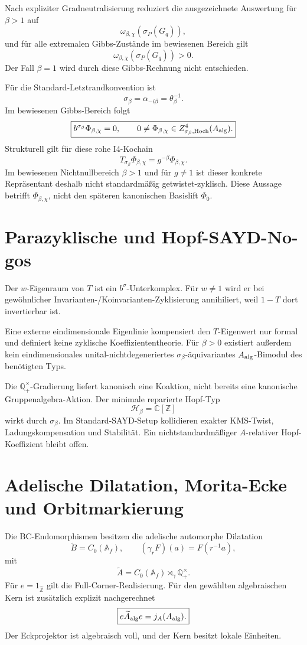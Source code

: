 \documentclass[11pt,a4paper]{article}
\begin{document}
Nach expliziter Gradneutralisierung reduziert die ausgezeichnete Auswertung für $\beta>1$ auf
\[
 \omega_{\beta,\chi}(\sigma_P(G_q)),
\]
und für alle extremalen Gibbs-Zustände im bewiesenen Bereich gilt
\[
 \boxed{\omega_{\beta,\chi}(\sigma_P(G_q))>0.}
\]
Der Fall $\beta=1$ wird durch diese Gibbs-Rechnung nicht entschieden.

Für die Standard-Letztrandkonvention ist
\[
 \boxed{\sigma_\beta=\alpha_{-i\beta}=\theta_\beta^{-1}.}
\]
Im bewiesenen Gibbs-Bereich folgt
\[
 \boxed{b^{\sigma_\beta}\Phi_{\beta,\chi}=0,\qquad
 0\neq\Phi_{\beta,\chi}\in Z^4_{\sigma_\beta,\mathrm{Hoch}}(A_{\rm alg}).}
\]
Strukturell gilt für diese rohe I4-Kochain
\[
 \boxed{T_{\sigma_\beta}\Phi_{\beta,\chi}=g^{-\beta}\Phi_{\beta,\chi}.}
\]
Im bewiesenen Nichtnullbereich $\beta>1$ und für $g\neq1$ ist dieser konkrete Repräsentant deshalb nicht standardmäßig getwistet-zyklisch. Diese Aussage betrifft $\Phi_{\beta,\chi}$, nicht den späteren kanonischen Basislift $\Phi_0$.

\section{Parazyklische und Hopf-SAYD-No-gos}

Der $w$-Eigenraum von $T$ ist ein $b^\sigma$-Unterkomplex. Für $w\neq1$ wird er bei gewöhnlicher Invarianten-/Koinvarianten-Zyklisierung annihiliert, weil $1-T$ dort invertierbar ist.

Eine externe eindimensionale Eigenlinie kompensiert den $T$-Eigenwert nur formal und definiert keine zyklische Koeffiziententheorie. Für $\beta>0$ existiert außerdem kein eindimensionales unital-nichtdegeneriertes $\sigma_\beta$-äquivariantes $A_{\rm alg}$-Bimodul des benötigten Typs.

Die $\mathbb Q_+^\times$-Gradierung liefert kanonisch eine Koaktion, nicht bereits eine kanonische Gruppenalgebra-Aktion. Der minimale reparierte Hopf-Typ
\[
 \mathcal H_\beta=\mathbb C[\mathbb Z]
\]
wirkt durch $\sigma_\beta$. Im Standard-SAYD-Setup kollidieren exakter KMS-Twist, Ladungskompensation und Stabilität. Ein nichtstandardmäßiger $A$-relativer Hopf-Koeffizient bleibt offen.

\section{Adelische Dilatation, Morita-Ecke und Orbitmarkierung}

Die BC-Endomorphismen besitzen die adelische automorphe Dilatation
\[
 \widetilde B=C_0(\mathbb A_f),\qquad (\gamma_rF)(a)=F(r^{-1}a),
\]
mit
\[
 \widetilde A=C_0(\mathbb A_f)\rtimes_\gamma\mathbb Q_+^\times.
\]
Für $e=1_{\widehat{\mathbb Z}}$ gilt die Full-Corner-Realisierung. Für den gewählten algebraischen Kern ist zusätzlich explizit nachgerechnet
\[
 \boxed{e\widetilde A_{\rm alg}e=j_A(A_{\rm alg}).}
\]
Der Eckprojektor ist algebraisch voll, und der Kern besitzt lokale Einheiten.
\end{document}
